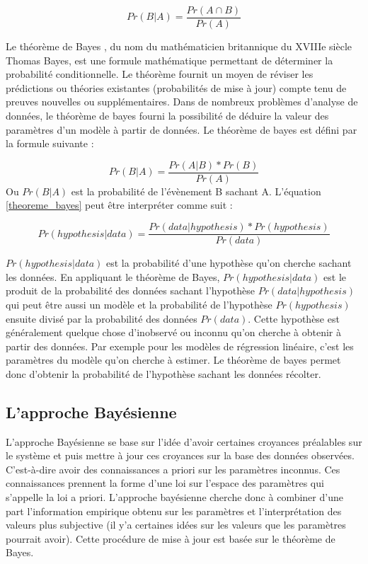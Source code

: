 \begin{equation}
	Pr(B|A) = \frac{Pr(A \cap B)}{Pr(A)}
	\label{conditionnelle_probability}
\end{equation}

Le théorème de Bayes , du nom du mathématicien britannique du XVIIIe siècle Thomas Bayes, est une formule mathématique permettant de déterminer la probabilité conditionnelle. Le théorème fournit un moyen de réviser les prédictions ou théories existantes (probabilités de mise à jour) compte tenu de preuves nouvelles ou supplémentaires. Dans de nombreux problèmes d'analyse de données, le théorème de bayes fourni la possibilité de déduire la valeur des paramètres d'un modèle à partir de données. Le théorème de bayes est défini par la formule suivante :

\begin{equation}
	Pr(B|A) = \frac{Pr(A|B)*Pr(B)}{Pr(A)}
	\label{theoreme_bayes}
\end{equation}
Ou \(\displaystyle Pr(B|A) \) est la probabilité de l’évènement B sachant A. L’équation \ref{theoreme_bayes} peut être interpréter comme suit :

\begin{equation}
	Pr(hypothesis|data) = \frac{Pr(data|hypothesis)*Pr(hypothesis)}{Pr(data)}
	\label{theoreme_bayes2}
\end{equation}


\(\displaystyle Pr(hypothesis|data) \) est la probabilité d’une hypothèse qu’on cherche sachant les données. En appliquant le théorème de Bayes, \(\displaystyle Pr(hypothesis|data) \)  est le produit de la probabilité des données sachant l’hypothèse \(\displaystyle Pr(data|hypothesis) \) qui peut être aussi un modèle et la probabilité de l’hypothèse \(\displaystyle Pr(hypothesis) \) ensuite divisé par la probabilité des données \(\displaystyle Pr(data) \). Cette hypothèse est généralement quelque chose d’inobservé ou inconnu qu’on cherche à obtenir à partir des données. Par exemple pour les modèles de régression linéaire, c’est les paramètres du modèle qu’on cherche à estimer. Le théorème de bayes permet donc d’obtenir la probabilité de l’hypothèse sachant les données récolter.

\subsection{L’approche Bayésienne}
L’approche Bayésienne se base sur l’idée d’avoir certaines croyances préalables sur le système et puis mettre à jour ces croyances sur la base des données observées. C’est-à-dire avoir des connaissances a priori sur les paramètres inconnus. Ces connaissances prennent la forme d’une loi sur l’espace des paramètres qui s’appelle la loi a priori. L’approche bayésienne cherche donc à combiner d’une part l’information empirique obtenu sur les paramètres et l’interprétation des valeurs plus subjective (il y’a certaines idées sur les valeurs que les paramètres pourrait avoir). Cette procédure de mise à jour est basée sur le théorème de Bayes.

